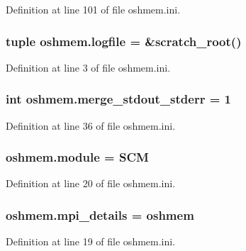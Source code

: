 Definition at line 101 of file oshmem.\-ini.

\hypertarget{namespaceoshmem_a0dd8ce9816b9130b80561197098590a2}{
\subsubsection[{logfile}]{\setlength{\rightskip}{0pt plus 5cm}tuple oshmem.\-logfile = \&scratch\-\_\-root()}}\label{namespaceoshmem_a0dd8ce9816b9130b80561197098590a2}


Definition at line 3 of file oshmem.\-ini.

\hypertarget{namespaceoshmem_a54bae833e0060c0baf9bc9574845aea8}{
\subsubsection[{merge\-\_\-stdout\-\_\-stderr}]{\setlength{\rightskip}{0pt plus 5cm}int oshmem.\-merge\-\_\-stdout\-\_\-stderr = 1}}\label{namespaceoshmem_a54bae833e0060c0baf9bc9574845aea8}


Definition at line 36 of file oshmem.\-ini.

\hypertarget{namespaceoshmem_a9406859c141622f8f2f7210af080e99c}{
\subsubsection[{module}]{\setlength{\rightskip}{0pt plus 5cm}oshmem.\-module = S\-C\-M}}\label{namespaceoshmem_a9406859c141622f8f2f7210af080e99c}


Definition at line 20 of file oshmem.\-ini.

\hypertarget{namespaceoshmem_aeba1fd4df4f5814da0588fb749d7acfa}{
\subsubsection[{mpi\-\_\-details}]{\setlength{\rightskip}{0pt plus 5cm}oshmem.\-mpi\-\_\-details = oshmem}}\label{namespaceoshmem_aeba1fd4df4f5814da0588fb749d7acfa}


Definition at line 19 of file oshmem.\-ini.

